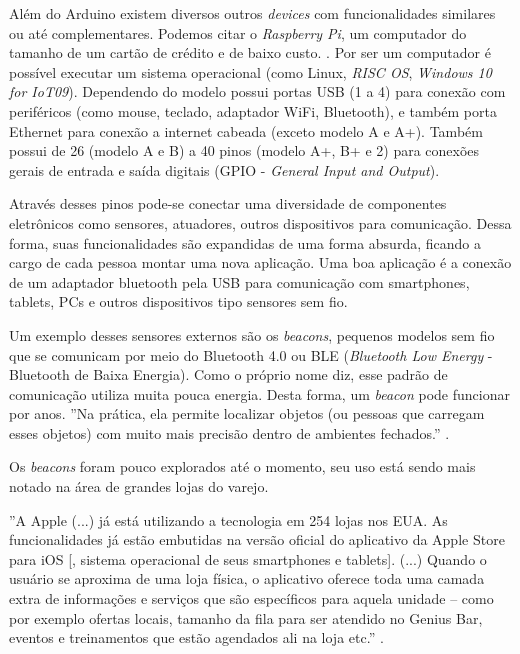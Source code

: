 \documentclass[
	12pt,				%
	openright,			%
	oneside,			%
	a4paper,			%
	chapter=TITLE,		%
	english,			%
	brazil				%
	]{abntex2}
\begin{document}
{Além do Arduino existem diversos outros \textit{devices} com funcionalidades similares ou até complementares. Podemos citar o \textit{Raspberry Pi}, um computador do tamanho de um cartão de crédito e de baixo custo. \cite{raspberrypi-rpi}. Por ser um computador é possível executar um sistema operacional (como Linux, \textit{RISC OS}, \textit{Windows 10 for IoT09}). Dependendo do modelo possui portas USB (1 a 4) para conexão com periféricos (como mouse, teclado, adaptador WiFi, Bluetooth), e também porta Ethernet para conexão a internet cabeada (exceto modelo A e A+). Também possui de 26 (modelo A e B) a 40 pinos (modelo A+, B+ e 2) para conexões gerais de entrada e saída digitais (GPIO - \textit{General Input and Output}). 

Através desses pinos pode-se conectar uma diversidade de componentes eletrônicos como sensores, atuadores, outros dispositivos para comunicação. Dessa forma, suas funcionalidades são expandidas de uma forma absurda, ficando a cargo de cada pessoa montar uma nova aplicação. Uma boa aplicação é a conexão de um adaptador bluetooth pela USB para comunicação com smartphones, tablets, PCs e outros dispositivos tipo sensores sem fio.

Um exemplo desses sensores externos são os \textit{beacons}, pequenos modelos sem fio que se comunicam por meio do Bluetooth 4.0 ou BLE (\textit{Bluetooth Low Energy} - Bluetooth de Baixa Energia). Como o próprio nome diz, esse padrão de comunicação utiliza muita pouca energia. Desta forma, um \textit{beacon} pode funcionar por anos. ''Na prática, ela permite localizar objetos (ou pessoas que carregam esses objetos) com muito mais precisão dentro de ambientes fechados.'' \cite{teixeira-beacon}.

Os \textit{beacons} foram pouco explorados até o momento, seu uso está sendo mais notado na área de grandes lojas do varejo.

\begin{citacao}
''A Apple (...) já está utilizando a tecnologia em 254 lojas nos EUA. As funcionalidades já estão embutidas na versão oficial do aplicativo da Apple Store para iOS [, sistema operacional de seus smartphones e tablets]. (...) Quando o usuário se aproxima de uma loja física, o aplicativo oferece toda uma camada extra de informações e serviços que são específicos para aquela unidade – como por exemplo ofertas locais, tamanho da fila para ser atendido no Genius Bar, eventos e treinamentos que estão agendados ali na loja etc.'' \cite{teixeira-beacon}.
\end{citacao}

}
\end{document}
